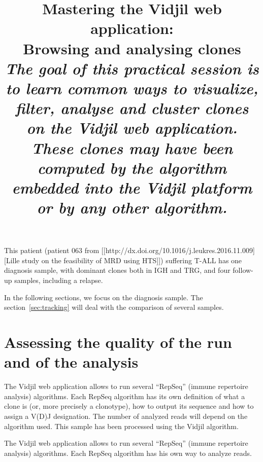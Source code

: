 \documentclass[10pt]{article}
\title{Mastering the Vidjil web application:\\ Browsing and analysing clones
\\[2ex] \normalsize 
\textit{The goal of this practical session is to learn
common ways to visualize, filter, analyse and cluster clones
on the Vidjil web application.
%
These clones may have been computed by the algorithm
embedded into the Vidjil platform or by any other algorithm.}
}
\begin{document}
\maketitle
\bigskip


This patient (patient 063 from [[http://dx.doi.org/10.1016/j.leukres.2016.11.009][Lille study on the feasibility of MRD using HTS]]) suffering T-ALL has one diagnosis sample,
with dominant clones both in IGH and TRG,
and four follow-up samples, including a relapse.


In the following sections, we focus on the diagnosis sample.
The section~\ref{sec:tracking} will deal with the comparison of several samples. 

\section{Assessing the quality of the run and of the analysis}
The Vidjil web application allows to run several ``RepSeq'' (immune repertoire analysis) algorithms.
Each RepSeq algorithm has its own definition of what a clone is (or, more precisely
a clonotype), how to output its sequence and how to assign a V(D)J designation.
The number of analyzed reads will depend on the algorithm used.
This sample has been processed using the Vidjil algorithm.



The Vidjil web application allows to run several ``RepSeq'' (immune repertoire analysis) algorithms.
Each RepSeq algorithm has his own way to analyze reads.

\end{document}
